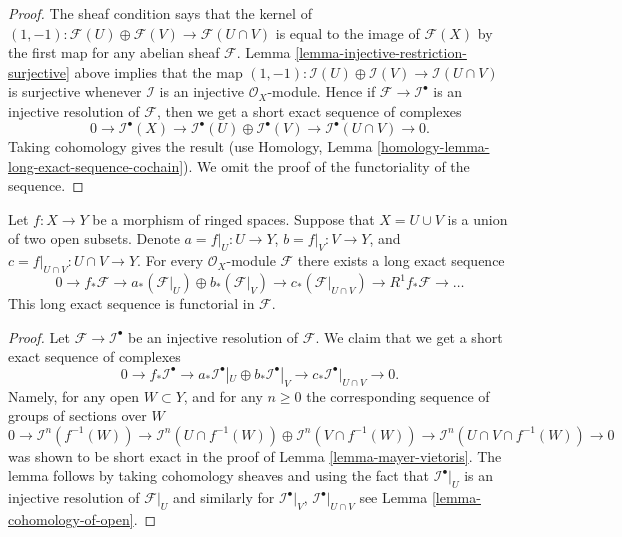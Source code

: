 \begin{proof}
The sheaf condition says that the kernel of
$(1, -1) : \mathcal{F}(U) \oplus \mathcal{F}(V) \to \mathcal{F}(U \cap V)$
is equal to the image of $\mathcal{F}(X)$ by the first map
for any abelian sheaf $\mathcal{F}$.
Lemma \ref{lemma-injective-restriction-surjective} above implies that the map
$(1, -1) : \mathcal{I}(U) \oplus \mathcal{I}(V) \to \mathcal{I}(U \cap V)$
is surjective whenever $\mathcal{I}$ is an injective $\mathcal{O}_X$-module.
Hence if $\mathcal{F} \to \mathcal{I}^\bullet$ is an injective resolution
of $\mathcal{F}$, then we get a short exact sequence of complexes
$$
0 \to
\mathcal{I}^\bullet(X) \to
\mathcal{I}^\bullet(U) \oplus \mathcal{I}^\bullet(V) \to
\mathcal{I}^\bullet(U \cap V) \to
0.
$$
Taking cohomology gives the result (use
Homology, Lemma \ref{homology-lemma-long-exact-sequence-cochain}).
We omit the proof of the functoriality of the sequence.
\end{proof}

\begin{lemma}
\label{lemma-relative-mayer-vietoris}
Let $f : X \to Y$ be a morphism of ringed spaces.
Suppose that $X = U \cup V$ is a union of two open subsets.
Denote $a = f|_U : U \to Y$, $b = f|_V : V \to Y$, and
$c = f|_{U \cap V} : U \cap V \to Y$.
For every $\mathcal{O}_X$-module $\mathcal{F}$
there exists a long exact sequence
$$
0 \to
f_*\mathcal{F} \to
a_*(\mathcal{F}|_U) \oplus b_*(\mathcal{F}|_V) \to
c_*(\mathcal{F}|_{U \cap V}) \to
R^1f_*\mathcal{F} \to \ldots
$$
This long exact sequence is functorial in $\mathcal{F}$.
\end{lemma}

\begin{proof}
Let $\mathcal{F} \to \mathcal{I}^\bullet$ be an injective resolution
of $\mathcal{F}$. We claim that we
get a short exact sequence of complexes
$$
0 \to
f_*\mathcal{I}^\bullet \to
a_*\mathcal{I}^\bullet|_U \oplus b_*\mathcal{I}^\bullet|_V \to
c_*\mathcal{I}^\bullet|_{U \cap V} \to
0.
$$
Namely, for any open $W \subset Y$, and for any $n \geq 0$ the
corresponding sequence of groups of sections over $W$
$$
0 \to
\mathcal{I}^n(f^{-1}(W)) \to
\mathcal{I}^n(U \cap f^{-1}(W))
\oplus \mathcal{I}^n(V \cap f^{-1}(W)) \to
\mathcal{I}^n(U \cap V \cap f^{-1}(W)) \to
0
$$
was shown to be short exact in the proof of Lemma \ref{lemma-mayer-vietoris}.
The lemma follows by taking cohomology sheaves and using the fact that
$\mathcal{I}^\bullet|_U$ is an injective resolution of $\mathcal{F}|_U$
and similarly for $\mathcal{I}^\bullet|_V$, $\mathcal{I}^\bullet|_{U \cap V}$
see Lemma \ref{lemma-cohomology-of-open}.
\end{proof}




















